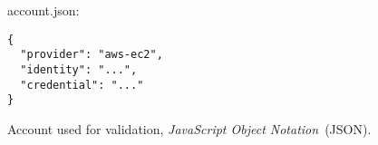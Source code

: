 \begin{figure}[tb]
  \begin{center}
    account.json:
    \begin{verbatim}
{
  "provider": "aws-ec2", 
  "identity": "...",
  "credential": "..."
}
    \end{verbatim}
  \end{center}
  \caption{Account used for validation, \emph{JavaScript Object Notation}~(JSON).}
  \label{list:validation-account}
\end{figure}

